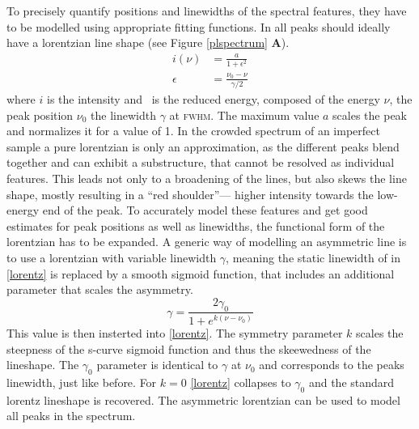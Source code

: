To precisely quantify positions and linewidths of the spectral features, they have to be modelled using appropriate fitting functions. In \pl all peaks should ideally have a lorentzian line shape (see Figure \ref{plspectrum} \textbf{A}). 
\begin{align}
i(\nu)&= \frac{a}{1+\epsilon^2} \\
\epsilon &= \frac{\nu_0 - \nu}{\gamma /2}\label{lorentz}
\end{align}
where $i$ is the intensity and \epsilon\ is the reduced energy, composed of the energy $\nu$, the peak position $\nu_0$ the linewidth $\gamma$ at \textsc{fwhm}. The maximum value $a$ scales the peak and normalizes it for a value of 1. In the crowded spectrum of an imperfect sample a pure lorentzian is only an approximation, as the different peaks blend together and can exhibit a substructure, that cannot be resolved as individual features. This leads not only to a broadening of the lines, but also skews the line shape, mostly resulting in a ``red shoulder''--- higher intensity towards the low-energy end of the peak. To accurately model these features and get good estimates for peak positions as well as linewidths, the functional form of the lorentzian has to be expanded. A generic way of modelling an asymmetric line is to use a lorentzian with variable linewidth $\gamma$, meaning the static linewidth of in \ref{lorentz} is replaced by a smooth sigmoid function, that includes an additional parameter that scales the asymmetry\cite{stancik_simple_2008}.
\begin{equation} \gamma = \frac{2\gamma_0}{1+e^{k(\nu-\nu_0)}}\label{asymlorentz} \end{equation}
This value is then insterted into \eqref{lorentz}. The symmetry parameter $k$ scales the steepness of the s-curve sigmoid function and thus the skeewedness of the lineshape. The $\gamma_0$ parameter is identical to $\gamma$ at $\nu_0$ and corresponds to the peaks linewidth, just like before. For $k=0$ \eqref{lorentz} collapses to $\gamma_0$ and the standard lorentz lineshape is recovered. The asymmetric lorentzian can be used to model all peaks in the \pl spectrum.

